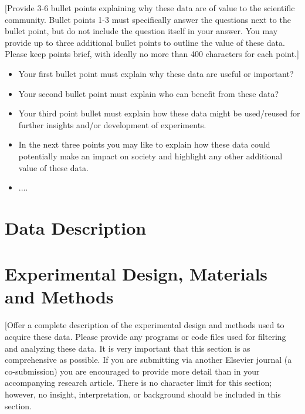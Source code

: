 \documentclass[times,final]{elsarticle}
\begin{document}
[Provide 3-6 bullet points explaining why these data are of value to the scientific community.
Bullet points 1-3 must specifically answer the questions next to the bullet point,
but do not include the question itself in your answer. You may
provide up to three additional bullet points to outline the value of these data.
Please keep points brief, with ideally no more than 400 characters for each point.]

\begin{itemize}
\itemsep=0pt
\parsep=0pt
\item Your first bullet point must explain why these data are useful or important?
\item Your second bullet point must explain who can benefit from these data?
\item Your third point bullet must explain how these data might be used/reused for
further insights and/or development of experiments.
\item In the next three points you may like to explain how these data could
potentially make an impact on society and highlight any other additional value of these data.
\item ....
\end{itemize}

\section*{Data Description}


\section*{Experimental Design, Materials and Methods}

\noindent [Offer a complete description of the experimental design and methods
used to acquire these data. Please provide any programs or code files
used for filtering and analyzing these data. It is very important that
this section is as comprehensive as possible. If you are submitting via
another Elsevier journal (a co-submission) you are encouraged to
provide more detail than in your accompanying research article. There
is no character limit for this section; however, no insight,
interpretation, or background should be included in this section.
\end{document}
